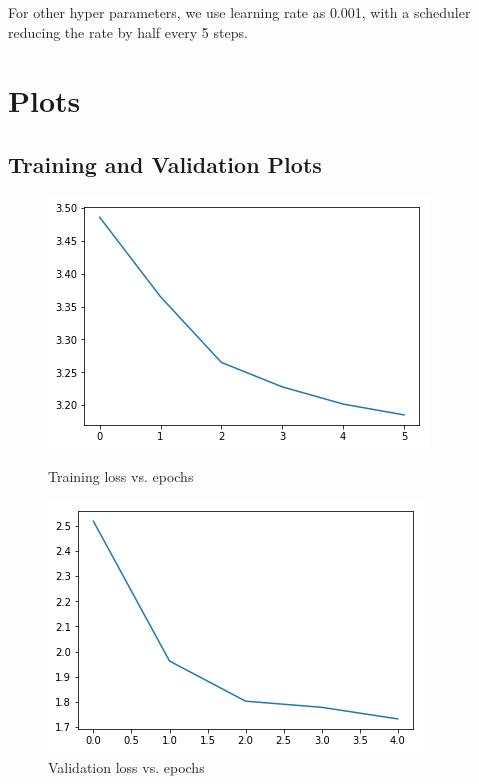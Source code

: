 \documentclass{article}
\begin{document}
For other hyper parameters, we use learning rate as 0.001, with a scheduler reducing the rate by half every 5 steps.
\newpage
\section{Plots}
\subsection{Training and Validation Plots}
\begin{figure}[h]
\begin{minipage}{0.48\textwidth}
\centering
\includegraphics[width=\textwidth]{pics/train_loss_epoch.png}
\caption{Training loss vs. epochs}
\end{minipage}\hfill
\begin{minipage}{0.48\textwidth}
\centering
\includegraphics[width=\textwidth]{pics/val_loss_epoch.png}
\caption{Validation loss vs. epochs}
\end{minipage}
\end{figure}
\end{document}
